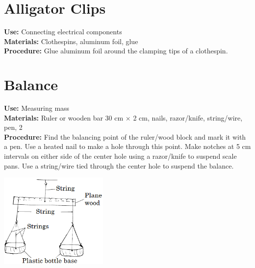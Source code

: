\begin{multicols}{2}

\section{Alligator Clips}
\label{sec:alligator-clips}
\vspace{-10pt}
\textbf{Use:} Connecting electrical components\\
\textbf{Materials:} Clothespins, aluminum foil, glue\\
\textbf{Procedure:} Glue aluminum foil around the clamping tips of a clothespin.

\section{Balance}
\label{sec:balance}
\vspace{-10pt}
\textbf{Use:} Measuring mass\\
\textbf{Materials:} Ruler or wooden bar 30 cm $\times$ 2 cm, nails, razor/knife, string/wire, pen, 2 \\
\textbf{Procedure:} Find the balancing point of the ruler/wood block and mark it with a pen. Use a heated nail to make a hole through this point. Make notches at 5 cm intervals on either side of the center hole using a razor/knife to suspend scale pans. Use a string/wire tied through the center hole to suspend the balance.
\begin{center}
\includegraphics[width=0.4\textwidth]{./img/beam-balance-2.png}
\end{center}

\columnbreak


\end{multicols}
